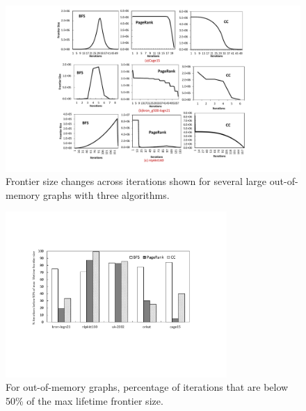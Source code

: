 \begin{figure}[!t]
\centering
\includegraphics[width=\textwidth,height=\textheight,keepaspectratio]{figures/frontier2.pdf}
\caption{Frontier size changes across iterations shown for several large out-of-memory graphs with three algorithms. 
 }
\label{fig:frontier2}
\end{figure}

\begin{figure}[!t]
\centering
\includegraphics[width=0.75\textwidth,height=0.75\textheight,keepaspectratio]{figures/frontier_exp.pdf}
\caption{For out-of-memory graphs, percentage of iterations that are below 50\% of the max lifetime frontier size.  
 }
\label{fig:frontier_exp}
\end{figure}


